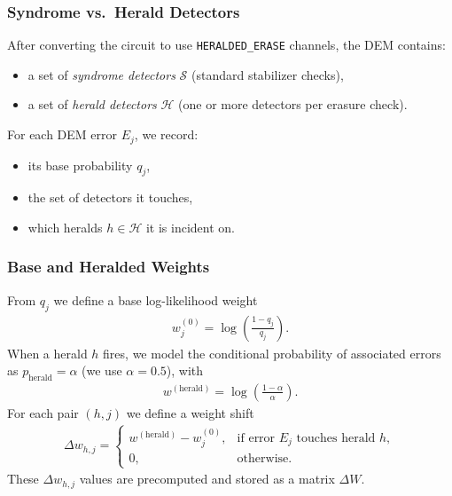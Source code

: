 \documentclass[11pt, notitlepage, letterpaper]{article}
\begin{document}
\subsubsection*{Syndrome vs.\ Herald Detectors}

After converting the circuit to use \texttt{HERALDED\_ERASE} channels, the DEM contains:
\begin{itemize}
    \item a set of \emph{syndrome detectors} $\mathcal{S}$ (standard stabilizer checks),
    \item a set of \emph{herald detectors} $\mathcal{H}$ (one or more detectors per erasure check).
\end{itemize}

For each DEM error $E_j$, we record:
\begin{itemize}
    \item its base probability $q_j$,
    \item the set of detectors it touches,
    \item which heralds $h \in \mathcal{H}$ it is incident on.
\end{itemize}

\subsubsection*{Base and Heralded Weights}

From $q_j$ we define a base log-likelihood weight
\begin{align}
    w^{(0)}_j = \log\!\left(\frac{1 - q_j}{q_j}\right).
\end{align}
When a herald $h$ fires, we model the conditional probability of associated errors as $p_{\mathrm{herald}} = \alpha$ (we use $\alpha = 0.5$), with
\begin{align}
    w^{(\mathrm{herald})} = \log\!\left(\frac{1 - \alpha}{\alpha}\right).
\end{align}
For each pair $(h,j)$ we define a weight shift
\begin{align}
    \Delta w_{h,j} =
    \begin{cases}
        w^{(\mathrm{herald})} - w^{(0)}_j, & \text{if error } E_j \text{ touches herald } h, \\[4pt]
        0,                                 & \text{otherwise}.
    \end{cases}
\end{align}
These $\Delta w_{h,j}$ values are precomputed and stored as a matrix $\Delta W$.
\end{document}
